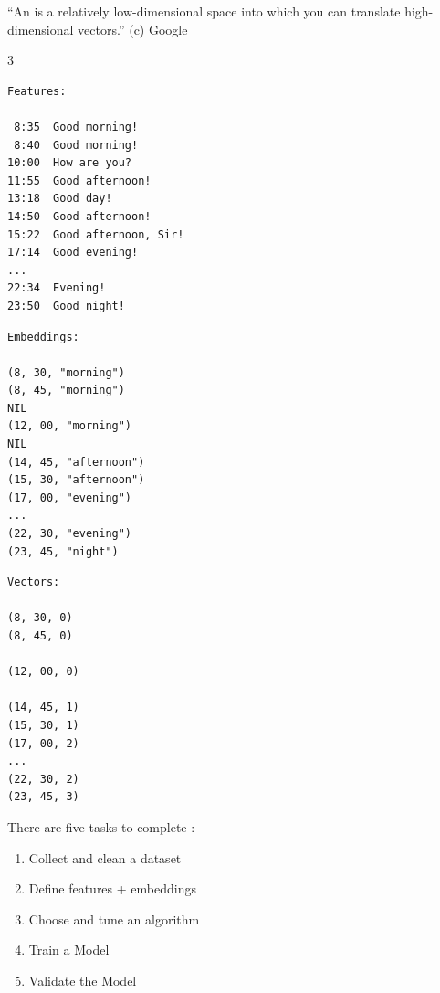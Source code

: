 \documentclass{article}
\begin{document}
\plush{}


``An  is a relatively low-dimensional space into which you can translate high-dimensional vectors.'' (c) Google

\begin{multicols}{3}
{\scriptsize\begin{verbatim}
Features:

 8:35  Good morning!
 8:40  Good morning!
10:00  How are you?
11:55  Good afternoon!
13:18  Good day!
14:50  Good afternoon!
15:22  Good afternoon, Sir!
17:14  Good evening!
...
22:34  Evening!
23:50  Good night!
\end{verbatim}
}
\par\columnbreak\par
{\scriptsize\begin{verbatim}
Embeddings:

(8, 30, "morning")
(8, 45, "morning")
NIL
(12, 00, "morning")
NIL
(14, 45, "afternoon")
(15, 30, "afternoon")
(17, 00, "evening")
...
(22, 30, "evening")
(23, 45, "night")
\end{verbatim}
}
\par\columnbreak\par
{\scriptsize\begin{verbatim}
Vectors:

(8, 30, 0)
(8, 45, 0)

(12, 00, 0)

(14, 45, 1)
(15, 30, 1)
(17, 00, 2)
...
(22, 30, 2)
(23, 45, 3)
\end{verbatim}
}
\end{multicols}

\plush{}


There are five tasks to complete :

\begin{enumerate}
  \item Collect and clean a dataset
  \item Define features + embeddings
  \item Choose and tune an algorithm
  \item Train a Model
  \item Validate the Model
\end{enumerate}

\plush{}

\end{document}
